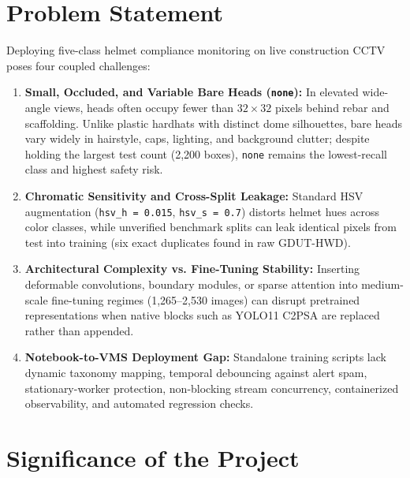 \section{Problem Statement}

Deploying five-class helmet compliance monitoring on live construction CCTV poses four coupled challenges:

\begin{enumerate}[leftmargin=1.9em, itemsep=2.5pt]
  \item \textbf{Small, Occluded, and Variable Bare Heads (\texttt{none}):} In elevated wide-angle views, heads often occupy fewer than $32 \times 32$ pixels behind rebar and scaffolding. Unlike plastic hardhats with distinct dome silhouettes, bare heads vary widely in hairstyle, caps, lighting, and background clutter; despite holding the largest test count (2,200 boxes), \texttt{none} remains the lowest-recall class and highest safety risk.
  \item \textbf{Chromatic Sensitivity and Cross-Split Leakage:} Standard HSV augmentation (\texttt{hsv\_h = 0.015}, \texttt{hsv\_s = 0.7}) distorts helmet hues across color classes, while unverified benchmark splits can leak identical pixels from test into training (six exact duplicates found in raw GDUT-HWD).
  \item \textbf{Architectural Complexity vs. Fine-Tuning Stability:} Inserting deformable convolutions, boundary modules, or sparse attention into medium-scale fine-tuning regimes (1,265--2,530 images) can disrupt pretrained representations when native blocks such as YOLO11 C2PSA are replaced rather than appended.
  \item \textbf{Notebook-to-VMS Deployment Gap:} Standalone training scripts lack dynamic taxonomy mapping, temporal debouncing against alert spam, stationary-worker protection, non-blocking stream concurrency, containerized observability, and automated regression checks.
\end{enumerate}

\section{Significance of the Project}


